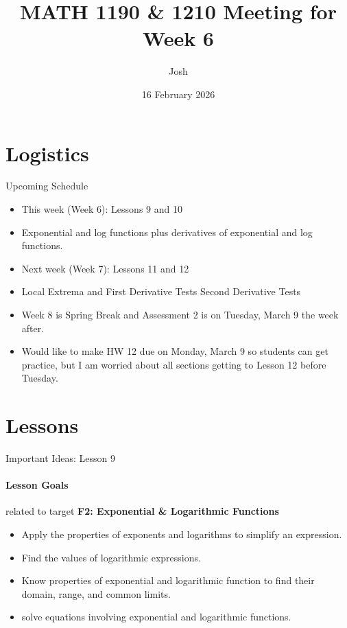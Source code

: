 \documentclass{beamer}
\title{MATH 1190 \& 1210 Meeting for Week 6}
\author{Josh}
\date{16 February 2026}
\newcommand{\transition}[1]{\frame{{}\begin{center}\fbox{#1}\end{center}}}
\begin{document}
\maketitle
\section*{Logistics}

\transition{Logistics}
\begin{frame}{Upcoming Schedule}
\begin{itemize}
    \item This week (Week 6): Lessons 9 and 10
    \item Exponential and log functions plus derivatives of exponential and log functions.
    \item Next week (Week 7): Lessons 11 and 12
    \item Local Extrema and First Derivative Tests Second Derivative Tests
    \item Week 8 is Spring Break and Assessment 2 is on Tuesday, March 9 the week after.
    \item Would like to make HW 12 due on Monday, March 9 so students can get practice, but I am worried about all sections getting to Lesson 12 before Tuesday.
\end{itemize}
\end{frame}

\section{Lessons}

\transition{Lessons}


\begin{frame}{Important Ideas: Lesson 9}
\paragraph{Lesson Goals} related to target {\bf\color{ProcessBlue} F2: Exponential \& Logarithmic Functions}
\begin{itemize}
    \item Apply the properties of exponents and logarithms to simplify an expression. 
    \item Find the values of logarithmic expressions.
    \item Know properties of exponential and logarithmic function to find their domain, range, and common limits.
    \item solve equations involving exponential and logarithmic functions.
\end{itemize}
\end{frame}
\end{document}
